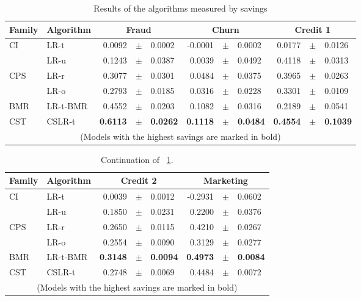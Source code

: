 \begin{table}
    \centering
    \footnotesize
    \begin{tabular}{l l r@{\hskip 0in}c@{\hskip 0in}l r@{\hskip 0in}c@{\hskip 0in}l r@{\hskip 
    0in}c@{\hskip 0in}l  } %
    \hline
    \bf{Family} & \bf{Algorithm} & \multicolumn{3}{c}{\bf{Fraud}} & 
    \multicolumn{3}{c}{\bf{Churn}} & \multicolumn{3}{c}{\bf{Credit 1}} \\ 
    \hline
CI&LR-t & 0.0092 &$\pm$& 0.0002 & -0.0001 &$\pm$& 0.0002 & 0.0177 &$\pm$& 0.0126\\ 
&LR-u & 0.1243 &$\pm$& 0.0387 & 0.0039 &$\pm$& 0.0492 & 0.4118 &$\pm$& 0.0313\\ 
\hline 
CPS&LR-r & 0.3077 &$\pm$& 0.0301 & 0.0484 &$\pm$& 0.0375 & 0.3965 &$\pm$& 0.0263\\ 
&LR-o & 0.2793 &$\pm$& 0.0185 & 0.0316 &$\pm$& 0.0228 & 0.3301 &$\pm$& 0.0109\\ 
\hline 
BMR&LR-t-BMR & 0.4552 &$\pm$& 0.0203 & 0.1082 &$\pm$& 0.0316 & 0.2189 &$\pm$& 0.0541\\ 
\hline 
CST&CSLR-t & \bf{0.6113} &\bf{$\pm$}& \bf{0.0262} & \bf{0.1118} &\bf{$\pm$}& \bf{0.0484} & 
\bf{0.4554} &\bf{$\pm$}& \bf{0.1039}\\ 
\hline
  \multicolumn{11}{c}{(Models with the highest savings are marked in bold)}
  \end{tabular}
    \caption{Results of the algorithms measured by savings}
    \label{tab:7:results_savings}
  \end{table}
  
\begin{table}
    \centering
    \footnotesize
    \begin{tabular}{l l r@{\hskip 0in}c@{\hskip 0in}l r@{\hskip 0in}c@{\hskip 0in}l  } %
    \hline
    \bf{Family} & \bf{Algorithm} &  \multicolumn{3}{c}{\bf{Credit 2}} 
& \multicolumn{3}{c}{\bf{Marketing}} \\ 
    \hline
CI&LR-t & 0.0039 &$\pm$& 0.0012 & -0.2931 &$\pm$& 0.0602\\ 
&LR-u & 0.1850 &$\pm$& 0.0231 & 0.2200 &$\pm$& 0.0376\\ 
\hline 
CPS&LR-r & 0.2650 &$\pm$& 0.0115 & 0.4210 &$\pm$& 0.0267\\ 
&LR-o & 0.2554 &$\pm$& 0.0090 & 0.3129 &$\pm$& 0.0277\\ 
\hline 
BMR&LR-t-BMR & \bf{0.3148} &\bf{$\pm$}& \bf{0.0094} & \bf{0.4973} &\bf{$\pm$}& \bf{0.0084}\\ 
\hline 
CST&CSLR-t & 0.2748 &$\pm$& 0.0069 & 0.4484 &$\pm$& 0.0072\\ 
\hline 
  \multicolumn{8}{c}{(Models with the highest savings are marked in bold)}
  \end{tabular}
    \caption{Continuation of \tablename{~\ref{tab:7:results_savings}}.}
    \label{tab:7:results_savings2}
  \end{table}

